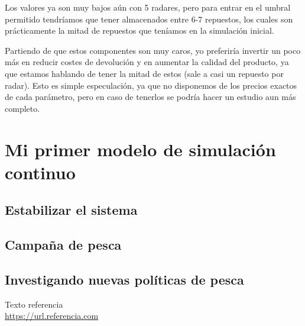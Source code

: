 \documentclass[11pt,a4paper]{report}
\begin{document}
\begin{table}[H]
\centering
{}
\end{table}

Los valores ya son muy bajos aún con 5 radares, pero para entrar en el umbral permitido tendríamos que tener almacenados entre 6-7 repuestos,
los cuales son prácticamente la mitad de repuestos que teníamos en la simulación inicial.

Partiendo de que estos componentes son muy caros, yo preferiría invertir un poco más en reducir costes de devolución y en aumentar la calidad
del producto, ya que estamos hablando de tener la mitad de estos (sale a casi un repuesto por radar). Esto es simple especulación, ya que no
disponemos de los precios exactos de cada parámetro, pero en caso de tenerlos se podría hacer un estudio aun más completo.



\chapter{Mi primer modelo de simulación continuo}


\section{Estabilizar el sistema}


\section{Campaña de pesca}


\section{Investigando nuevas políticas de pesca}

\newpage

\begin{thebibliography}{5}

Texto referencia
\\\url{https://url.referencia.com}

\end{thebibliography}
\end{document}
